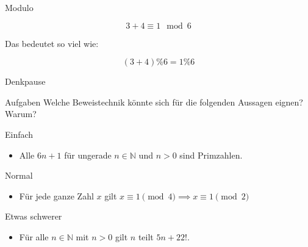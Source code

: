 %
%
%
%


\begin{frame}[fragile]{Modulo}
    \begin{center}
        \Large
        $$
            3+4 \equiv 1 \mod 6
        $$

        \pause
        Das bedeutet so viel wie:

        $$
            (3+4)\% 6 = 1 \% 6
        $$
    \end{center}
\end{frame}

{
\begin{frame}[fragile]{Denkpause}
    \begin{alertblock}{Aufgaben}
    Welche Beweistechnik könnte sich für die folgenden Aussagen eignen? Warum?
    \end{alertblock}
    
    \begin{block}{Einfach}
        \begin{itemize}
            \item Alle $6n+1$ für ungerade $n \in \mathbb{N}$ und $n > 0$ sind Primzahlen.
        \end{itemize}
    \end{block}
    \begin{block}{Normal}
    \begin{itemize}
            \item Für jede ganze Zahl $x$ gilt $x\equiv 1\pmod 4 \implies x\equiv 1\pmod 2$
    \end{itemize}
    \end{block}
    \begin{block}{Etwas schwerer}
        \begin{itemize}
            \item Für alle $n \in \mathbb{N}$ mit $n>0$ gilt $n$ teilt $5n + 22!$.
        \end{itemize}
    \end{block}
\end{frame}
}

